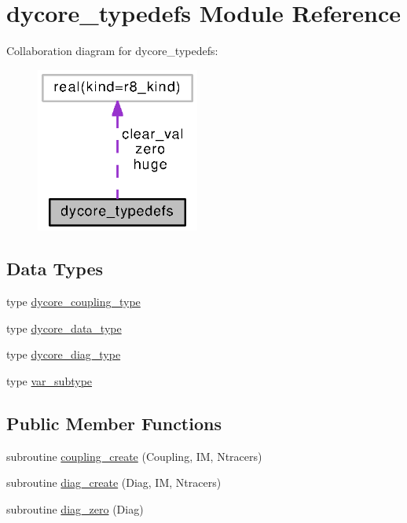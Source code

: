 \section{dycore\-\_\-typedefs Module Reference}
\label{classdycore__typedefs}


Collaboration diagram for dycore\-\_\-typedefs\-:
\nopagebreak
\begin{figure}[H]
\begin{center}
\leavevmode
\includegraphics[width=152pt]{classdycore__typedefs__coll__graph}
\end{center}
\end{figure}
\subsection*{Data Types}
\begin{DoxyCompactItemize}
\item 
type \hyperlink{structdycore__typedefs_1_1dycore__coupling__type}{dycore\-\_\-coupling\-\_\-type}
\item 
type \hyperlink{structdycore__typedefs_1_1dycore__data__type}{dycore\-\_\-data\-\_\-type}
\item 
type \hyperlink{structdycore__typedefs_1_1dycore__diag__type}{dycore\-\_\-diag\-\_\-type}
\item 
type \hyperlink{structdycore__typedefs_1_1var__subtype}{var\-\_\-subtype}
\end{DoxyCompactItemize}
\subsection*{Public Member Functions}
\begin{DoxyCompactItemize}
\item 
subroutine \hyperlink{classdycore__typedefs_a38faf32efa46d5157193e3c6ff98533e}{coupling\-\_\-create} (Coupling, I\-M, Ntracers)
\item 
subroutine \hyperlink{classdycore__typedefs_a6a4ce247c95b0a8791caf9ce5c4f28b0}{diag\-\_\-create} (Diag, I\-M, Ntracers)
\item 
subroutine \hyperlink{classdycore__typedefs_a9b0e3a5b8a1e2e40e721055f51c3a437}{diag\-\_\-zero} (Diag)
\end{DoxyCompactItemize}
